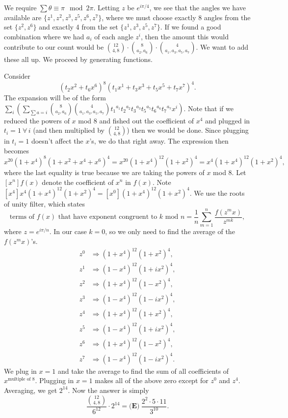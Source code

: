 \begin{enumerate}
 We require $\sum\theta\equiv\pi \mod 2\pi$. Letting $z$ be $e^{i\pi/4}$, we see that the angles we have available are $\{z^1,z^2,z^3,z^5,z^6,z^7\}$, where we must choose exactly 8 angles from the set $\{z^2,z^6\}$ and exactly 4 from the set $\{z^1,z^3,z^5,z^7\}$. If we found a good combination where we had $a_i$ of each angle $z^i$, then the amount this would contribute to our count would be $\binom{12}{4,8}\cdot\binom{8}{a_2,a_6}\cdot\binom{4}{a_1,a_3,a_5,a_7}$. We want to add these all up. We proceed by generating functions.

 Consider 
 \[(t_2x^2+t_6x^6)^8(t_1x^1+t_3x^3+t_5x^5+t_7x^7)^4.\] The expansion will be of the form $\sum_i\left(\sum_{\sum a=i} \binom{8}{a_2,a_6}\binom{4}{a_1,a_3,a_5,a_7}{t_1}^{a_1}{t_2}^{a_2}{t_3}^{a_3}{t_5}^{a_5}{t_6}^{a_6}{t_7}^{a_7}x^i \right)$. Note that if we reduced the powers of $x$ mod $8$ and fished out the coefficient of $x^4$ and plugged in $t_i=1\ \forall\,i$ (and then multiplied by $\binom{12}{4,8}$) then we would be done. Since plugging in $t_i=1$ doesn't affect the $x$'s, we do that right away. The expression then becomes 
 \[x^{20}(1+x^4)^8(1+x^2+x^4+x^6)^4=x^{20}(1+x^4)^{12}(1+x^2)^4=x^4(1+x^4)^{12}(1+x^2)^4,\] where the last equality is true because we are taking the powers of $x$ mod $8$. Let $[x^n]f(x)$ denote the coefficient of $x^n$ in $f(x)$. Note $[x^4] x^4(1+x^4)^{12}(1+x^2)^4=[x^0](1+x^4)^{12}(1+x^2)^4$. We use the roots of unity filter, which states 
 \[\text{terms of }f(x)\text{ that have exponent congruent to }k\text{ mod }n=\frac{1}{n}\sum_{m=1}^n \frac{f(z^mx)}{z^{mk}},\] where $z=e^{i\pi/n}$. In our case $k=0$, so we only need to find the average of the $f(z^mx)$'s.
 \begin{align*} z^0 &\Longrightarrow (1+x^4)^{12}(1+x^2)^4,\\ z^1 &\Longrightarrow (1-x^4)^{12}(1+ix^2)^4,\\ z^2 &\Longrightarrow (1+x^4)^{12}(1-x^2)^4,\\ z^3 &\Longrightarrow (1-x^4)^{12}(1-ix^2)^4,\\ z^4 &\Longrightarrow (1+x^4)^{12}(1+x^2)^4,\\ z^5 &\Longrightarrow (1-x^4)^{12}(1+ix^2)^4,\\ z^6 &\Longrightarrow (1+x^4)^{12}(1-x^2)^4,\\ z^7 &\Longrightarrow (1-x^4)^{12}(1-ix^2)^4. \end{align*}
We plug in $x=1$ and take the average to find the sum of all coefficients of $x^{\text{multiple of 8}}$. Plugging in $x=1$ makes all of the above zero except for $z^0$ and $z^4$. Averaging, we get $2^{14}$. Now the answer is simply 
 \[\frac{\binom{12}{4,8}}{6^{12}}\cdot 2^{14}=\boxed{\textbf{(E)} ~\frac{2^2\cdot 5\cdot 11}{3^{10}}}.\]





\end{enumerate}
